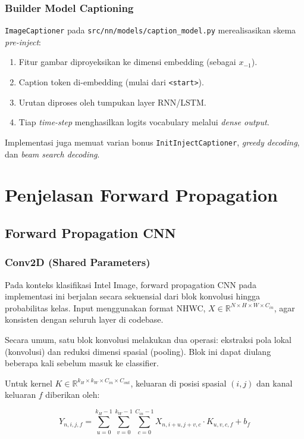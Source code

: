 \subsubsection{Builder Model Captioning}
\texttt{ImageCaptioner} pada \texttt{src/nn/models/caption\_model.py} merealisasikan skema \textit{pre-inject}:

\begin{enumerate}
    \item Fitur gambar diproyeksikan ke dimensi embedding (sebagai $x_{-1}$).
    \item Caption token di-embedding (mulai dari \texttt{<start>}).
    \item Urutan diproses oleh tumpukan layer RNN/LSTM.
    \item Tiap \textit{time-step} menghasilkan logits vocabulary melalui \textit{dense output}.
\end{enumerate}

Implementasi juga memuat varian bonus \texttt{InitInjectCaptioner}, \textit{greedy decoding}, dan \textit{beam search decoding}.

\section{Penjelasan Forward Propagation}

\subsection{Forward Propagation CNN}

\subsubsection{Conv2D (Shared Parameters)}
Pada konteks klasifikasi Intel Image, forward propagation CNN pada implementasi ini berjalan secara sekuensial dari blok konvolusi hingga probabilitas kelas. Input menggunakan format NHWC,
$X \in \mathbb{R}^{N \times H \times W \times C_{in}}$, agar konsisten dengan seluruh layer di codebase.

Secara umum, satu blok konvolusi melakukan dua operasi: ekstraksi pola lokal (konvolusi) dan reduksi dimensi spasial (pooling). Blok ini dapat diulang beberapa kali sebelum masuk ke classifier.

Untuk kernel
$K \in \mathbb{R}^{k_H \times k_W \times C_{in} \times C_{out}}$, keluaran di posisi spasial $(i,j)$ dan kanal keluaran $f$ diberikan oleh:

\begin{equation}
Y_{n,i,j,f} = \sum_{u=0}^{k_H-1}\sum_{v=0}^{k_W-1}\sum_{c=0}^{C_{in}-1}
X_{n, i+u, j+v, c} \cdot K_{u,v,c,f} + b_f
\end{equation}

